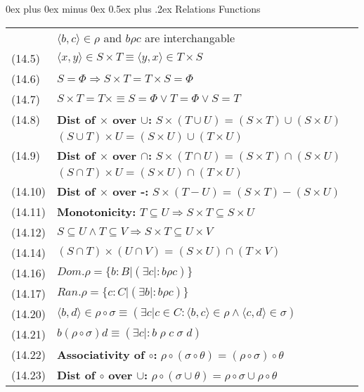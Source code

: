 \documentclass[letterpaper, 8pt]{extarticle}
\makeatletter
\renewcommand{\section}{\@startsection{section}{1}{0mm}%
                                {0ex plus 0ex minus 0ex}%
                                {0.5ex plus .2ex}%
                                {\normalfont\normalsize\bfseries}}
\makeatother
\begin{document}
\begin{multicols*}{3}
    \section{Relations  Functions}
    \begin{tabulary}{\linewidth}{@{}lLL@{}}
        & $\langle b, c \rangle \in \rho$ and $b \rho c$ are interchangable \\
        (14.5) & $\langle x, y \rangle \in S \times T \equiv \langle y, x \rangle \in T \times S$ &\\
        (14.6) & $S = \Phi \Rightarrow S \times T = T \times S = \Phi$ &\\
        (14.7) & $S \times T = T \times \equiv S = \Phi \lor T = \Phi \lor S = T$ &\\
        (14.8) &\textbf{Dist of $\times$ over $\cup$: } $S \times (T \cup U) = (S \times T) \cup (S \times U)$& \\
        & $(S \cup T) \times U = (S \times U) \cup (T \times U)$ &\\
        (14.9) &\textbf{Dist of $\times$ over $\cap$: } $S \times (T \cap U) = (S \times T) \cap (S \times U)$& \\
        & $(S \cap T) \times U = (S \times U) \cap (T \times U)$ &\\
        (14.10) &\textbf{Dist of $\times$ over -: } $S \times (T - U) = (S \times T) - (S \times U)$& \\
        (14.11) &\textbf{Monotonicity: } $T \subseteq U \Rightarrow S \times T \subseteq S \times U$& \\
        (14.12) & $S \subseteq U \land T \subseteq V \Rightarrow S \times T \subseteq U \times V$ &\\
        (14.14) & $(S \cap T) \times (U \cap V) = (S \times U) \cap (T \times V)$ &\\
        (14.16) & $Dom.\rho = \{b:B| (\exists c|: b \rho c)\}$ &\\
        (14.17) & $Ran.\rho = \{c:C| (\exists b|: b \rho c)\}$ &\\
        (14.20) & $\langle b, d \rangle \in \rho \circ \sigma \equiv (\exists c| c \in C: \langle b, c \rangle \in \rho \land \langle c, d \rangle \in \sigma)$ &\\
        (14.21) & $b (\rho \circ \sigma) d \equiv (\exists c|: b \; \rho \; c \; \sigma \; d)$ &\\
        (14.22) & \textbf{Associativity of $\circ$:}   $\rho \circ (\sigma \circ \theta) = (\rho \circ \sigma) \circ \theta$&\\
        (14.23) & \textbf{Dist of $\circ$ over $\cup$:}  $\rho \circ (\sigma \cup \theta) = \rho \circ \sigma \cup \rho \circ \theta$&\\

\end{tabulary}
\end{multicols*}
\end{document}
